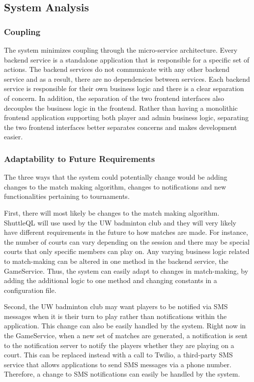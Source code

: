 \documentclass{article}
\begin{document}
\subsection{System Analysis}

\subsubsection{Coupling}
The system minimizes coupling through the micro-service architecture. Every backend service is a standalone application that is responsible for a specific set of actions. The backend services do not communicate with any other backend service and as a result, there are no dependencies between services. Each backend service is responsible for their own business logic and there is a clear separation of concern. In addition, the separation of the two frontend interfaces also decouples the business logic in the frontend. Rather than having a monolithic frontend application supporting both player and admin business logic, separating the two frontend interfaces better separates concerns and makes development easier.

\subsubsection{Adaptability to Future Requirements}
The three ways that the system could potentially change would be adding changes to the match making algorithm, changes to notifications and new functionalities pertaining to tournaments.

First, there will most likely be changes to the match making algorithm. ShuttleQL will use used by the UW badminton club and they will very likely have different requirements in the future to how matches are made. For instance, the number of courts can vary depending on the session and there may be special courts that only specific members can play on. Any varying business logic related to match-making can be altered in one method in the backend service, the GameService. Thus, the system can easily adapt to changes in match-making, by adding the additional logic to one method and changing constants in a configuration file.

Second, the UW badminton club may want players to be notified via SMS messages when it is their turn to play rather than notifications within the application. This change can also be easily handled by the system. Right now in the GameService, when a new set of matches are generated, a notification is sent to the notification server to notify the players whether they are playing on a court. This can be replaced instead with a call to Twilio, a third-party SMS service that allows applications to send SMS messages via a phone number. Therefore, a change to SMS notifications can easily be handled by the system.
\end{document}
